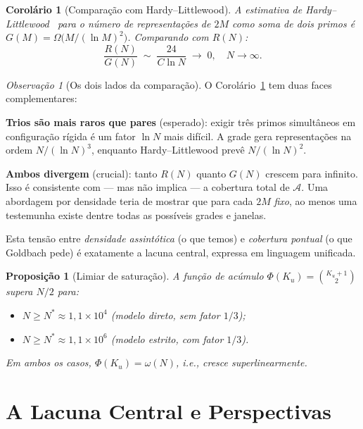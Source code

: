 \documentclass[12pt,a4paper]{article}
\newtheorem{proposition}[theorem]{Proposi\c{c}\~ao}
\newtheorem{corollary}[theorem]{Corol\'ario}
\theoremstyle{remark}
\newtheorem{remark}[theorem]{Observa\c{c}\~ao}
\newcommand{\calA}{\mathcal{A}}
\begin{document}
	\begin{corollary}[Comparação com Hardy--Littlewood]
		\label{cor:hl}
		A estimativa de Hardy--Littlewood~\cite{hardylittlewood1923} para o n\'umero de
		representa\c{c}\~oes de $2M$ como soma de dois primos \'e
		$G(M) = \Omega\!\bigl(M/(\ln M)^2\bigr)$.
		Comparando com $R(N)$:
		\[
		\frac{R(N)}{G(N)} \;\sim\; \frac{24}{C\ln N} \;\to\; 0, \quad N\to\infty.
		\]
	\end{corollary}
	
	\begin{remark}[Os dois lados da comparação]
		O Corol\'ario~\ref{cor:hl} tem duas faces complementares:
		
		\smallskip
		\textbf{Trios s\~ao mais raros que pares} (esperado): exigir tr\^es primos
		simult\^aneos em configura\c{c}\~ao r\'igida \'e um fator $\ln N$ mais dif\'icil.
		A grade gera representa\c{c}\~oes na ordem $N/(\ln N)^3$, enquanto Hardy--Littlewood
		prev\^e $N/(\ln N)^2$.
		
		\smallskip
		\textbf{Ambos divergem} (crucial): tanto $R(N)$ quanto $G(N)$ crescem para infinito.
		Isso \'e consistente com --- mas n\~ao implica --- a cobertura total de $\calA$.
		Uma abordagem por densidade teria de mostrar que para cada $2M$ \emph{fixo},
		ao menos uma testemunha existe dentre todas as poss\'iveis grades e janelas.
		
		\smallskip
		Esta tens\~ao entre \emph{densidade assint\'otica} (o que temos) e
		\emph{cobertura pontual} (o que Goldbach pede) \'e exatamente a lacuna
		central, expressa em linguagem unificada.
	\end{remark}
	
	\begin{proposition}[Limiar de saturação]
		A fun\c{c}\~ao de ac\'umulo $\Phi(K_u) = \binom{K_u+1}{2}$ supera $N/2$ para:
		\begin{itemize}
			\item $N \geq N^* \approx 1{,}1\times 10^4$ (modelo direto, sem fator $1/3$);
			\item $N \geq N^* \approx 1{,}1\times 10^6$ (modelo estrito, com fator $1/3$).
		\end{itemize}
		Em ambos os casos, $\Phi(K_u) = \omega(N)$, i.e., cresce superlinearmente.
	\end{proposition}
	
	\section{A Lacuna Central e Perspectivas}
	
\end{document}
